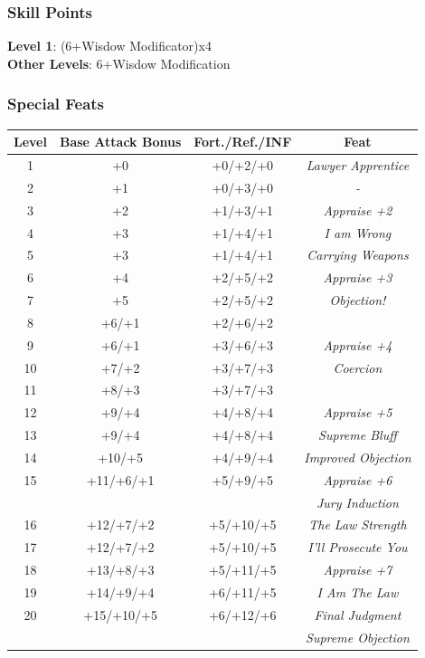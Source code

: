 \documentclass[ letterpaper,12pt]{article}
\begin{document}
\subsubsection{Skill Points}
{\bf Level 1}: (6+Wisdow Modificator)x4\\
{\bf Other Levels}: 6+Wisdow Modification\\

\subsubsection{Special Feats}

\begin{center} \begin{tabular}{|c||c|c|c|}
\hline
{\bf Level}&{\bf Base Attack Bonus}&{\bf Fort./Ref./INF}&{\bf Feat}\\
\hline
1&+0&+0/+2/+0&{\it Lawyer Apprentice}\\
\hline
2&+1&+0/+3/+0&{\it - }\\
\hline
3&+2&+1/+3/+1&{\it Appraise +2}\\
\hline
4&+3&+1/+4/+1&{\it I am Wrong}\\
\hline
5&+3&+1/+4/+1&{\it Carrying Weapons}\\
\hline
6&+4&+2/+5/+2&{\it Appraise +3}\\
\hline
7&+5&+2/+5/+2&{\it Objection!}\\
\hline
8&+6/+1&+2/+6/+2&\\
\hline
9 & +6/+1& +3/+6/+3 & {\it Appraise +4}\\
\hline
10 & +7/+2 & +3/+7/+3 & {\it Coercion}\\
\hline
11 & +8/+3 & +3/+7/+3 &\\
\hline
12 & +9/+4 & +4/+8/+4 & {\it Appraise +5}\\
\hline
13 & +9/+4 & +4/+8/+4 & {\it Supreme Bluff}\\
\hline
14 & +10/+5 & +4/+9/+4 & {\it Improved Objection}\\
\hline
15 & +11/+6/+1 & +5/+9/+5 & {\it Appraise +6}\\
   &           &          & {\it Jury Induction}\\
\hline
16 & +12/+7/+2 & +5/+10/+5 & {\it The Law Strength}\\
\hline
17 & +12/+7/+2 & +5/+10/+5 & {\it I'll Prosecute You}\\
\hline
18 & +13/+8/+3 & +5/+11/+5 & {\it Appraise +7}\\
\hline
19 & +14/+9/+4 & +6/+11/+5 & {\it I Am The Law}\\
\hline
20 & +15/+10/+5 & +6/+12/+6 & {\it Final Judgment}\\
   &            &           & {\it Supreme Objection}\\
\hline
\end{tabular} \end{center}
\end{document}
